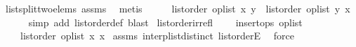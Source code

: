 \begin{isabellebody}
\ list{\isacharunderscore}split{\isacharunderscore}two{\isacharunderscore}elems\ assms\ \isamarkupfalse%
\ metis\isanewline
\ \ \isamarkupfalse%
\ \isamarkupfalse%
\ {\isachardoublequoteopen}list{\isacharunderscore}order\ op{\isacharunderscore}list\ x\ y\ {\isasymor}\ list{\isacharunderscore}order\ op{\isacharunderscore}list\ y\ x{\isachardoublequoteclose}\isanewline
\ \ \ \ \isamarkupfalse%
\ {\isacharparenleft}simp\ add{\isacharcolon}\ list{\isacharunderscore}order{\isacharunderscore}def{\isacharcomma}\ blast{\isacharparenright}\isanewline
{}\isamarkupfalse%
%
\endisatagproof
{\isafoldproof}%
%
\isadelimproof
\isanewline
%
\endisadelimproof
\isanewline
{}\isamarkupfalse%
\ list{\isacharunderscore}order{\isacharunderscore}irrefl{\isacharcolon}\isanewline
\ \ \ {}{\isacharcolon}\ {\isachardoublequoteopen}insert{\isacharunderscore}ops\ op{\isacharunderscore}list{\isachardoublequoteclose}\isanewline
\ \ \ {\isachardoublequoteopen}{\isasymnot}\ list{\isacharunderscore}order\ op{\isacharunderscore}list\ x\ x{\isachardoublequoteclose}\isanewline
%
\isadelimproof
%
\endisadelimproof
%
\isatagproof
{}\isamarkupfalse%
\ assms\ interp{\isacharunderscore}list{\isacharunderscore}distinct\ list{\isacharunderscore}orderE\ \isamarkupfalse%
\ force%
\endisatagproof
{\isafoldproof}%
%
\isadelimproof
\isanewline
%
\endisadelimproof
%
\isadelimtheory
\isanewline
%
\endisadelimtheory
%
\isatagtheory
{}\isamarkupfalse%
%
\endisatagtheory
{\isafoldtheory}%
%
\isadelimtheory
%
\endisadelimtheory
%
\end{isabellebody}%
